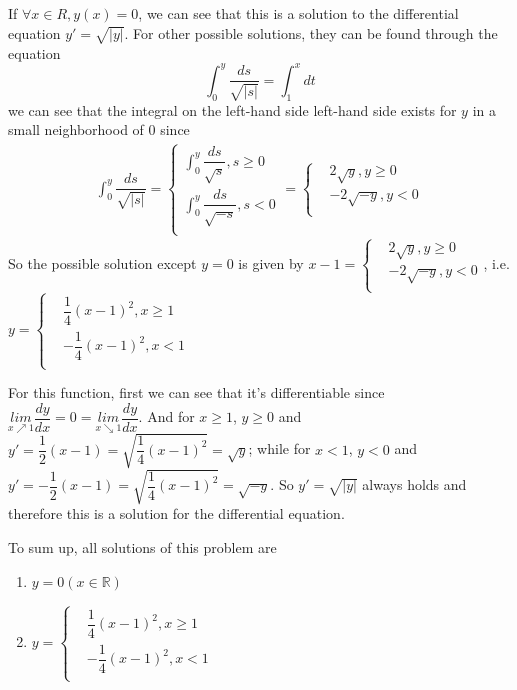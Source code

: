 \documentclass[a4paper,12pt,titlepage]{article}
\begin{document}
\subsection{}
If $\forall x\in R,y(x)=0$, we can see that this is a solution to the differential equation $y'=\sqrt{|y|}$. For other possible solutions, they can be found through the equation
$$\int^y_0\dfrac{ds}{\sqrt{|s|}}=\int_1^xdt$$ 
we can see that the integral on the left-hand side left-hand side exists for $y$ in a small neighborhood of 0 since
\begin{align*}
\int^y_0\dfrac{ds}{\sqrt{|s|}}=\left\{
\begin{aligned}
\int^y_0\dfrac{ds}{\sqrt{s}},s\geqslant0\\
\int^y_0\dfrac{ds}{\sqrt{-s}},s<0\\
\end{aligned}
\right.
=\left\{\begin{aligned}
&2\sqrt{y},y\geqslant0\\
&-2\sqrt{-y},y<0\\
\end{aligned}
\right.
\end{align*}
So the possible solution except $y=0$ is given by $x-1=\left\{\begin{aligned}
&2\sqrt{y},y\geqslant0\\
&-2\sqrt{-y},y<0\\
\end{aligned}
\right.$, i.e.$y=\left\{\begin{aligned}
&\dfrac{1}{4}(x-1)^2,x\geqslant1\\
&-\dfrac{1}{4}(x-1)^2,x<1\\
\end{aligned}
\right.$

For this function, first we can see that it's differentiable since $\underset{x\nearrow1}{lim}\dfrac{dy}{dx}=0=\underset{x\searrow1}{lim}\dfrac{dy}{dx}$. And for $x\geqslant1$, $y\geqslant0$ and  $y'=\dfrac{1}{2}(x-1)=\sqrt{\dfrac{1}{4}(x-1)^2}=\sqrt{y}$; while for $x<1$, $y<0$ and  $y'=-\dfrac{1}{2}(x-1)=\sqrt{\dfrac{1}{4}(x-1)^2}=\sqrt{-y}$. So $y'=\sqrt{|y|}$ always holds and therefore this is a solution for the differential equation.

To sum up, all solutions of this problem are
\begin{enumerate}
\item $y=0(x\in\mathbb{R})$
\item $y=\left\{\begin{aligned}
&\dfrac{1}{4}(x-1)^2,x\geqslant1\\
&-\dfrac{1}{4}(x-1)^2,x<1\\
\end{aligned}
\right.$
\end{enumerate} 
\end{document}
